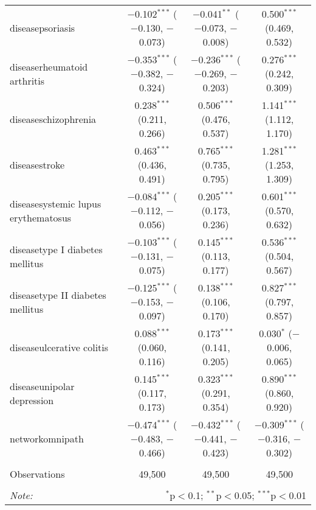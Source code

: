 \begin{table}[!htbp]
\begin{tabular}{@{\extracolsep{5pt}}lccc}
  diseasepsoriasis & $-$0.102$^{***}$ ($-$0.130, $-$0.073) & $-$0.041$^{**}$ ($-$0.073, $-$0.008) & 0.500$^{***}$ (0.469, 0.532) \\ 
  diseaserheumatoid arthritis & $-$0.353$^{***}$ ($-$0.382, $-$0.324) & $-$0.236$^{***}$ ($-$0.269, $-$0.203) & 0.276$^{***}$ (0.242, 0.309) \\ 
  diseaseschizophrenia & 0.238$^{***}$ (0.211, 0.266) & 0.506$^{***}$ (0.476, 0.537) & 1.141$^{***}$ (1.112, 1.170) \\ 
  diseasestroke & 0.463$^{***}$ (0.436, 0.491) & 0.765$^{***}$ (0.735, 0.795) & 1.281$^{***}$ (1.253, 1.309) \\ 
  diseasesystemic lupus erythematosus & $-$0.084$^{***}$ ($-$0.112, $-$0.056) & 0.205$^{***}$ (0.173, 0.236) & 0.601$^{***}$ (0.570, 0.632) \\ 
  diseasetype I diabetes mellitus & $-$0.103$^{***}$ ($-$0.131, $-$0.075) & 0.145$^{***}$ (0.113, 0.177) & 0.536$^{***}$ (0.504, 0.567) \\ 
  diseasetype II diabetes mellitus & $-$0.125$^{***}$ ($-$0.153, $-$0.097) & 0.138$^{***}$ (0.106, 0.170) & 0.827$^{***}$ (0.797, 0.857) \\ 
  diseaseulcerative colitis & 0.088$^{***}$ (0.060, 0.116) & 0.173$^{***}$ (0.141, 0.205) & 0.030$^{*}$ ($-$0.006, 0.065) \\ 
  diseaseunipolar depression & 0.145$^{***}$ (0.117, 0.173) & 0.323$^{***}$ (0.291, 0.354) & 0.890$^{***}$ (0.860, 0.920) \\ 
  networkomnipath & $-$0.474$^{***}$ ($-$0.483, $-$0.466) & $-$0.432$^{***}$ ($-$0.441, $-$0.423) & $-$0.309$^{***}$ ($-$0.316, $-$0.302) \\ 
 \hline \\[-1.8ex] 
Observations & 49,500 & 49,500 & 49,500 \\ 
\hline 
\hline \\[-1.8ex] 
\textit{Note:}  & \multicolumn{3}{r}{$^{*}$p$<$0.1; $^{**}$p$<$0.05; $^{***}$p$<$0.01} \\ 
\end{tabular} 
\end{table} 
